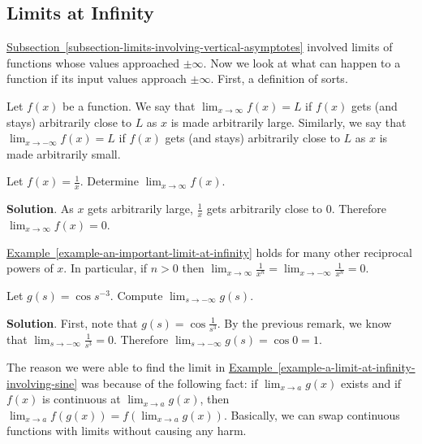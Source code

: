 \documentclass[10pt,]{book}
\theoremstyle{ptxplainnotitle}
\theoremstyle{ptxplaintitle}
\theoremstyle{ptxplainnotitle}
\theoremstyle{ptxplaintitle}
\theoremstyle{ptxplainnotitle}
\theoremstyle{ptxplaintitle}
\theoremstyle{ptxdefinitionnotitle}
\theoremstyle{ptxdefinitiontitle}
\theoremstyle{ptxdefinitionnotitle}
\theoremstyle{ptxdefinitiontitle}
\theoremstyle{ptxdefinitionnotitle}
\theoremstyle{ptxdefinitiontitle}
\theoremstyle{ptxdefinitionnotitle}
\theoremstyle{ptxdefinitiontitle}
\theoremstyle{ptxdefinitionnotitle}
\theoremstyle{ptxdefinitiontitle}
\numberwithin{equation}{section}
\begin{document}
\subsection[{Limits at Infinity}]{Limits at Infinity}\label{subsection-limits-at-infinity}
\hypertarget{p-59}{}%
\hyperref[subsection-limits-involving-vertical-asymptotes]{Subsection~\ref{subsection-limits-involving-vertical-asymptotes}} involved limits of functions whose values approached \(\pm\infty\). Now we look at what can happen to a function if its input values approach \(\pm\infty\). First, a definition of sorts.%
\begin{definition}\label{definition-limit-at-infinity}
\hypertarget{p-60}{}%
Let \(f(x)\) be a function. We say that \(\lim_{x\to\infty}f(x) = L\) if \(f(x)\) gets (and stays) arbitrarily close to \(L\) as \(x\) is made arbitrarily large. Similarly, we say that \(\lim_{x\to-\infty}f(x) = L\) if \(f(x)\) gets (and stays) arbitrarily close to \(L\) as \(x\) is made arbitrarily small.%
\end{definition}
\begin{example}\label{example-an-important-limit-at-infinity}
\hypertarget{p-61}{}%
Let \(f(x) = \frac{1}{x}\). Determine \(\lim_{x\to\infty}f(x)\).%
\par\smallskip%
\noindent\textbf{Solution}.\hypertarget{solution-12}{}\quad%
\hypertarget{p-62}{}%
As \(x\) gets arbitrarily large, \(\frac{1}{x}\) gets arbitrarily close to \(0\). Therefore \(\lim_{x\to\infty}f(x) = 0\).%
\end{example}
\hypertarget{p-63}{}%
\hyperref[example-an-important-limit-at-infinity]{Example~\ref{example-an-important-limit-at-infinity}} holds for many other reciprocal powers of \(x\). In particular, if \(n>0\) then \(\lim_{x\to\infty}\frac{1}{x^{n}} = \lim_{x\to-\infty}\frac{1}{x^{n}} = 0\).%
\begin{example}\label{example-a-limit-at-infinity-involving-sine}
\hypertarget{p-64}{}%
Let \(g(s) = \cos s^{-3}\). Compute \(\lim_{s\to-\infty}g(s)\).%
\par\smallskip%
\noindent\textbf{Solution}.\hypertarget{solution-13}{}\quad%
\hypertarget{p-65}{}%
First, note that \(g(s) = \cos\frac{1}{s^{3}}\). By the previous remark, we know that \(\lim_{s\to-\infty}\frac{1}{s^{3}} = 0\). Therefore \(\lim_{s\to-\infty}g(s) = \cos0 = 1\).%
\end{example}
\begin{aside}{}\label{aside-3}
\hypertarget{p-66}{}%
The reason we were able to find the limit in \hyperref[example-a-limit-at-infinity-involving-sine]{Example~\ref{example-a-limit-at-infinity-involving-sine}} was because of the following fact: if \(\lim_{x\to a}g(x)\) exists and if \(f(x)\) is continuous at \(\lim_{x\to a}g(x)\), then \(\lim_{x\to a}f(g(x)) = f(\lim_{x\to a}g(x))\). Basically, we can swap continuous functions with limits without causing any harm.%
\end{aside}
\end{document}
